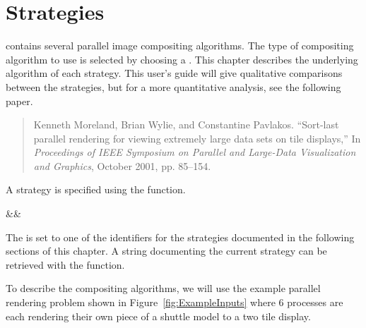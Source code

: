 

\chapter{Strategies}
\label{chap:Strategies}


\IceT contains several parallel image compositing algorithms.  The type of
compositing algorithm to use is selected by choosing a
.  This chapter describes the underlying
algorithm of each strategy.  This user's guide will give qualitative
comparisons between the strategies, but for a more quantitative analysis,
see the following paper.

\begin{quote}
  Kenneth Moreland, Brian Wylie, and Constantine Pavlakos.  ``Sort-last
  parallel rendering for viewing extremely large data sets on tile
  displays,'' In \emph{Proceedings of IEEE Symposium on Parallel and
    Large-Data Visualization and Graphics}, October 2001, pp. 85--154.
\end{quote}

A strategy is specified using the  function.

\begin{Table}{3}
  \textC{(}&&\quad\textC{);}
\end{Table}

The  is set to one of the identifiers for the strategies
documented in the following sections of this chapter.  A string documenting
the current strategy can be retrieved with the 
function.

To describe the \IceT compositing algorithms, we will use the example
parallel rendering problem shown in Figure~\ref{fig:ExampleInputs} where 6
processes are each rendering their own piece of a shuttle model to a two
tile display.

